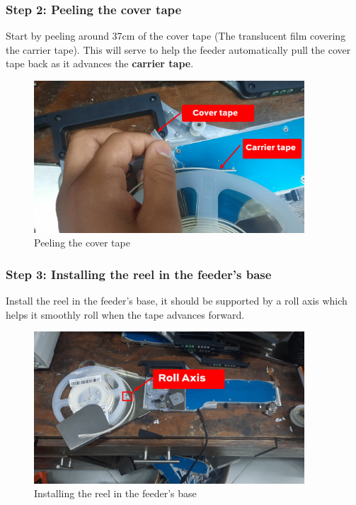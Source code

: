 \documentclass[a4paper,10pt]{report}
\begin{document}
\subsubsection{Step 2: Peeling the cover tape}
Start by peeling around 37cm of the cover tape (The translucent film covering the carrier tape). This will serve to help the feeder automatically pull the cover tape back as it advances the \textbf{carrier tape}.
\begin{figure}[!htb]
 \centering
 \includegraphics[width=0.9\textwidth]{step2.png}
 \caption{Peeling the cover tape}
\end{figure}
\subsubsection{Step 3: Installing the reel in the feeder's base}
Install the reel in the feeder's base, it should be supported by a roll axis which helps it smoothly roll when the tape advances forward.
\begin{figure}[!htb]
 \centering
 \includegraphics[width=0.9\textwidth]{step3.png}
 \caption{Installing the reel in the feeder's base}
\end{figure}
\newpage
\end{document}
